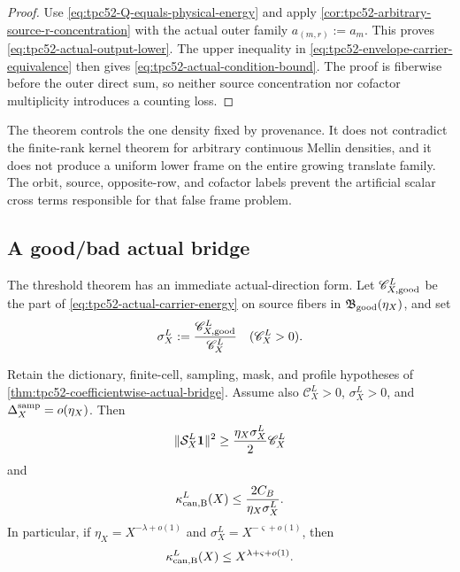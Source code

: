 \begin{proof}
Use \eqref{eq:tpc52-Q-equals-physical-energy} and apply
\cref{cor:tpc52-arbitrary-source-r-concentration} with the actual outer
family \(a_{(m,r)}:=a_m\).  This proves
\eqref{eq:tpc52-actual-output-lower}.  The upper inequality in
\eqref{eq:tpc52-envelope-carrier-equivalence} then gives
\eqref{eq:tpc52-actual-condition-bound}.  The proof is fiberwise before the
outer direct sum, so neither source concentration nor cofactor multiplicity
introduces a counting loss.
\end{proof}

The theorem controls the one density fixed by provenance.  It does not
contradict the finite-rank kernel theorem for arbitrary continuous Mellin
densities, and it does not produce a uniform lower frame on the entire
growing translate family.  The orbit, source, opposite-row, and cofactor
labels prevent the artificial scalar cross terms responsible for that false
frame problem.

\subsection{A good/bad actual bridge}

The threshold theorem has an immediate actual-direction form.  Let
\(\mathscr C_{X,\rm good}^L\) be the part of
\eqref{eq:tpc52-actual-carrier-energy} on source fibers in
\(\mathfrak B_{\rm good}(\eta_X)\), and set
\begin{equation}
 \sigma_X^L:=\frac{\mathscr C_{X,\rm good}^L}{\mathscr C_X^L}
 \quad(\mathscr C_X^L>0).
 \label{eq:tpc52-actual-good-fraction}
\end{equation}

\begin{corollary}
\label{cor:tpc52-energy-selected-actual-bridge}
Retain the dictionary, finite-cell, sampling, mask, and profile hypotheses of
\cref{thm:tpc52-coefficientwise-actual-bridge}.  Assume also
\(\mathscr C_X^L>0\), \(\sigma_X^L>0\), and
\(\Delta_X^{\rm samp}=o(\eta_X)\).  Then
\begin{equation}
 \|\mathcal S_X^L\mathbf 1\|^2
 \ge \frac{\eta_X\sigma_X^L}{2}\mathscr C_X^L
 \label{eq:tpc52-selected-output-lower}
\end{equation}
and
\begin{equation}
 \kappa_{\rm can,B}^L(X)
 \le \frac{2C_B}{\eta_X\sigma_X^L}.
 \label{eq:tpc52-selected-condition-bound}
\end{equation}
In particular, if
\(\eta_X=X^{-\lambda+o(1)}\) and
\(\sigma_X^L=X^{-\varsigma+o(1)}\), then
\begin{equation}
 \kappa_{\rm can,B}^L(X)
 \le X^{\lambda+\varsigma+o(1)}.
 \label{eq:tpc52-selected-condition-exponent}
\end{equation}
\end{corollary}


